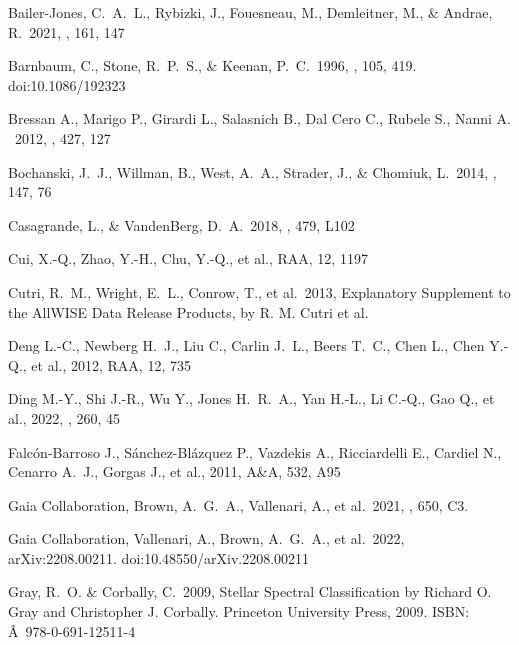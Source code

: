 \documentclass[manuscript]{aastex62}
\begin{document}
\begin{CJK*}{UTF8}{gbsn}
\begin{thebibliography}{}
 Bailer-Jones, C.~A.~L., Rybizki, J., Fouesneau, M., Demleitner, M., \& Andrae, R.\ 2021, \aj, 161, 147

 Barnbaum, C., Stone, R.~P.~S., \& Keenan, P.~C.\ 1996, \apjs, 105, 419. doi:10.1086/192323

Bressan A., Marigo P., Girardi L., Salasnich B., Dal Cero C., Rubele S., Nanni A. \ 2012, \mnras, 427, 127

 Bochanski, J.~J., Willman, B., West, A.~A., Strader, J., \& Chomiuk, L.\ 2014, \aj, 147, 76 

 Casagrande, L., \& VandenBerg, D.~A.\ 2018, \mnras, 479, L102 

 Cui, X.-Q., Zhao, Y.-H., Chu, Y.-Q., et al., RAA, 12, 1197

 Cutri, R.~M., Wright, E.~L., Conrow, T., et al.\ 2013, Explanatory Supplement to the AllWISE Data Release Products, by R. M. Cutri et al.

 Deng L.-C., Newberg H.~J., Liu C., Carlin J.~L., Beers T.~C., Chen L., Chen Y.-Q., et al., 2012, RAA, 12, 735


 Ding M.-Y., Shi J.-R., Wu Y., Jones H.~R.~A., Yan H.-L., Li C.-Q., Gao Q., et al., 2022, \apjs, 260, 45

 Falc{\'o}n-Barroso J., S{\'a}nchez-Bl{\'a}zquez P., Vazdekis A., Ricciardelli E., Cardiel N., Cenarro A.~J., Gorgas J., et al., 2011, A\&A, 532, A95

 Gaia Collaboration, Brown, A.~G.~A., Vallenari, A., et al.\ 2021, \aap, 650, C3.

 Gaia Collaboration, Vallenari, A., Brown, A.~G.~A., et al.\ 2022, arXiv:2208.00211. doi:10.48550/arXiv.2208.00211

 Gray, R.~O. \& Corbally, C.\ 2009, Stellar Spectral Classification by Richard O. Gray and Christopher J. Corbally. Princeton University Press, 2009. ISBN: {\^A} 978-0-691-12511-4



\end{thebibliography}
\end{CJK*}
\end{document}
